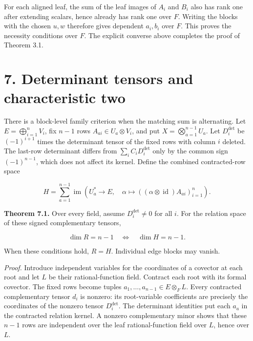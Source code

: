 \documentclass[11pt]{article}
\begin{document}
For each aligned leaf, the sum of the leaf images of $A_i$ and $B_i$ also has rank one after extending scalars, hence already has rank one over $F$. Writing the blocks with the chosen $u,w$ therefore gives dependent $a_i,b_i$ over $F$. This proves the necessity conditions over $F$. The explicit converse above completes the proof of Theorem 3.1.


\section*{7. Determinant tensors and characteristic two}

There is a block-level family criterion when the matching sum is alternating. Let $E=\bigoplus_{i=1}^nV_i$, fix $n-1$ rows $A_{ai}\in U_a\otimes V_i$, and put $X=\bigotimes_{a=1}^{n-1}U_a$. Let $D_i^{\det}$ be $(-1)^{i+1}$ times the determinant tensor of the fixed rows with column $i$ deleted. The last-row determinant differs from $\sum_i C_iD_i^{\det}$ only by the common sign $(-1)^{n-1}$, which does not affect its kernel. Define the combined contracted-row space


\nopagebreak[4]

\begin{equation}
H=\sum_{a=1}^{n-1}\operatorname{im}\left(
U_a^*\longrightarrow E,\quad
\alpha\longmapsto((\alpha\otimes\operatorname{id})A_{ai})_{i=1}^n
\right).
\tag{33}
\end{equation}

\textbf{Theorem 7.1.} Over every field, assume $D_i^{\det}\ne0$ for all $i$. For the relation space of these signed complementary tensors,


\nopagebreak[4]

\begin{equation}
\dim R=n-1\quad\Longleftrightarrow\quad\dim H=n-1.
\tag{34}
\end{equation}

When these conditions hold, $R=H$. Individual edge blocks may vanish.


\emph{Proof.} Introduce independent variables for the coordinates of a covector at each root and let $L$ be their rational-function field. Contract each root with its formal covector. The fixed rows become tuples $a_1,\ldots,a_{n-1}\in E\otimes_F L$. Every contracted complementary tensor $d_i$ is nonzero: its root-variable coefficients are precisely the coordinates of the nonzero tensor $D_i^{\det}$. The determinant identities put each $a_a$ in the contracted relation kernel. A nonzero complementary minor shows that these $n-1$ rows are independent over the leaf rational-function field over $L$, hence over $L$.
\end{document}
